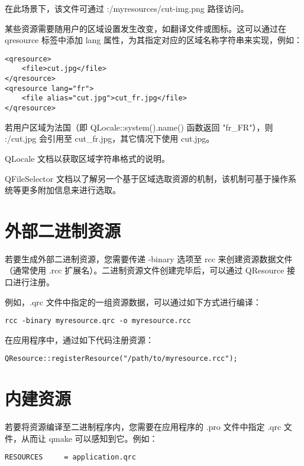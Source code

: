 在此场景下，该文件可通过 :/myresources/cut-img.png 路径访问。

某些资源需要随用户的区域设置发生改变，如翻译文件或图标。这可以通过在 qresource 标签中添加 lang 属性，为其指定对应的区域名称字符串来实现，例如：

\begin{lstlisting}
<qresource>
    <file>cut.jpg</file>
</qresource>
<qresource lang="fr">
    <file alias="cut.jpg">cut_fr.jpg</file>
</qresource>
\end{lstlisting}

若用户区域为法国（即 QLocale::system().name() 函数返回 "fr\_FR"），则 :/cut.jpg 会引用至 cut\_fr.jpg，其它情况下使用 cut.jpg。

\begin{notice}[另请参阅]
QLocale 文档以获取区域字符串格式的说明。
\end{notice}

\begin{notice}[另请参阅]
QFileSelector 文档以了解另一个基于区域选取资源的机制，该机制可基于操作系统等更多附加信息来进行选取。
\end{notice}

\section{外部二进制资源}

若要生成外部二进制资源，您需要传递 -binary 选项至 rcc 来创建资源数据文件（通常使用 .rcc 扩展名）。二进制资源文件创建完毕后，可以通过 QResource 接口进行注册。

例如，.qrc 文件中指定的一组资源数据，可以通过如下方式进行编译：

\begin{lstlisting}
rcc -binary myresource.qrc -o myresource.rcc
\end{lstlisting}

在应用程序中，通过如下代码注册资源：

\begin{lstlisting}
QResource::registerResource("/path/to/myresource.rcc");
\end{lstlisting}

\section{内建资源}

若要将资源编译至二进制程序内，您需要在应用程序的 .pro 文件中指定 .qrc 文件，从而让 qmake 可以感知到它。例如：

\begin{lstlisting}
RESOURCES     = application.qrc
\end{lstlisting}

